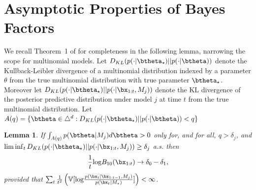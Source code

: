 \documentclass[11pt]{article}
\def\log{{\rm log}}
\newtheorem{lemma}{Lemma}[section]
\begin{document}
\section{Asymptotic Properties of Bayes Factors}
\label{app:asymptotics}
We recall Theorem~1 of \cite{walker} for completeness in the following lemma, narrowing the scope for multinomial models.
Let $D_{KL}(p(\cdot|\btheta_\star)||p(\cdot|\btheta) )$ denote the Kullback-Leibler divergence of a multinomial distribution indexed by a parameter $\theta$ from the true multinomial distribution with true parameter $\btheta_{\star}$.
Moreover let $D_{KL}(p(\cdot|\btheta_\star)||p(\cdot|\bx_{1:t}, M_j) )$ denote the KL divergence of the posterior predictive distribution under model $j$ at time $t$ from the true multinomial distribution.
Let $A(q) = \lbrace \btheta \in \triangle^d : D_{KL}(p(\cdot|\btheta_\star)||p(\cdot|\btheta) ) < q \rbrace$
\begin{lemma}
  \label{lemma:walker}
  If $\int_{A(q)} p(\btheta|M_j) d\btheta > 0$ only for, and for all, $q > \delta_j$, and $\lim \inf_t D_{KL}(p(\cdot|\btheta_\star)||p(\cdot|\bx_{1:t}, M_j) ) \geq \delta_j$ a.s.
then
  \begin{equation}
    \label{eq:bayes_factor_convergence}
    \frac{1}{t} \log B_{10}(\bx_{1:t}) \rightarrow \delta_0 - \delta_1,
  \end{equation}
  provided that $\sum_t \frac{1}{t^2} \left( \mathbb{V}[\log \frac{p(\bx_t|\bx_{1:t-1},M_j)}{p(\bx_t|M_\star )}]\right) < \infty$.
\end{lemma}
\end{document}
